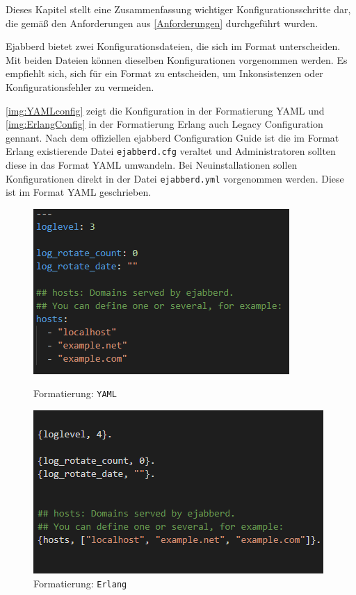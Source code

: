 \documentclass[a4paper,titlepage,halfparskip,12pt]{scrreprt}
\begin{document}
\begin{onehalfspacing}
Dieses Kapitel stellt eine Zusammenfassung wichtiger Konfigurationsschritte dar, die gemäß den Anforderungen aus \autoref{Anforderungen} durchgeführt wurden.

Ejabberd bietet zwei Konfigurationsdateien, die sich im Format unterscheiden. Mit beiden Dateien können dieselben Konfigurationen vorgenommen werden. Es empfiehlt sich, sich für ein Format zu entscheiden, um Inkonsistenzen oder Konfigurationsfehler zu vermeiden.

\autoref{img:YAMLconfig} zeigt die Konfiguration in der Formatierung \ac{YAML} und \autoref{img:ErlangConfig} in der Formatierung Erlang auch Legacy Configuration gennant. Nach dem offiziellen ejabberd Configuration Guide \cite{ejabberdDoc} ist die im Format Erlang existierende Datei \texttt{ejabberd.cfg} veraltet und Administratoren sollten diese in das Format \ac{YAML} umwandeln. Bei Neuinstallationen sollen Konfigurationen direkt in der Datei \texttt{ejabberd.yml} vorgenommen werden. Diese ist im Format \ac{YAML} geschrieben.

\begin{figure}
\centering
\begin{minipage}{.5\textwidth}
  \centering
  \includegraphics[width=.8\linewidth]{images/exampleYAMLConfig}
  \caption{Formatierung: \texttt{YAML}}
  \label{img:YAMLconfig}
\end{minipage}%
\begin{minipage}{.5\textwidth}
  \centering
  \includegraphics[width=.9\linewidth]{images/ejabberdErlangConfig}
  \caption{Formatierung: \texttt{Erlang}}
  \label{img:ErlangConfig}
\end{minipage}
\end{figure}


\end{onehalfspacing}
\end{document}
